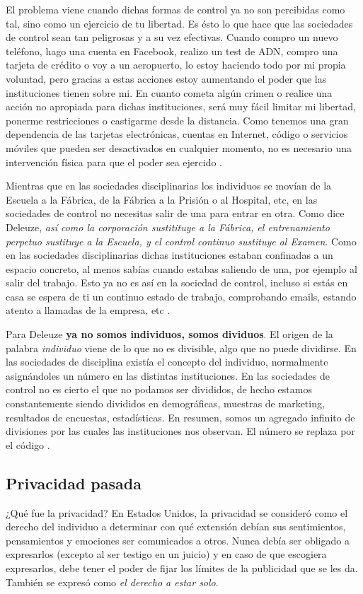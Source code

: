 \documentclass[11pt]{article}
\begin{document}
El problema viene cuando dichas formas de control ya no son percibidas como tal, sino como un ejercicio de tu libertad. Es ésto lo que hace que las sociedades de control sean tan peligrosas y a su vez efectivas. Cuando compro un nuevo teléfono, hago una cuenta en Facebook, realizo un test de ADN, compro una tarjeta de crédito o voy a un aeropuerto, lo estoy haciendo todo por mi propia voluntad, pero gracias a estas acciones estoy aumentando el poder que las instituciones tienen sobre mi. En cuanto cometa algún crimen o realice una acción no apropiada para dichas instituciones, será muy fácil limitar mi libertad, ponerme restricciones o castigarme desde la distancia. Como tenemos una gran dependencia de las tarjetas electrónicas, cuentas en Internet, código o servicios móviles que pueden ser desactivados en cualquier momento, no es necesario una intervención física para que el poder sea ejercido \cite{cp-societies}.

Mientras que en las sociedades disciplinarias los individuos se movían de la Escuela a la Fábrica, de la Fábrica a la Prisión o al Hospital, etc, en las sociedades de control no necesitas salir de una para entrar en otra. Como dice Deleuze, \textit{así como la corporación sustitituye a la Fábrica, el entrenamiento perpetuo sustituye a la Escuela, y el control continuo sustituye al Examen}. Como en las sociedades disciplinarias dichas instituciones estaban confinadas a un espacio concreto, al menos sabías cuando estabas saliendo de una, por ejemplo al salir del trabajo. Esto ya no es así en la sociedad de control, incluso si estás en casa se espera de ti un continuo estado de trabajo, comprobando emails, estando atento a llamadas de la empresa, etc \cite{cp-societies}.

Para Deleuze \textbf{ya no somos individuos, somos dividuos}. El origen de la palabra \textit{individuo} viene de lo que no es divisible, algo que no puede dividirse. En las sociedades de disciplina existía el concepto del individuo, normalmente asignándoles un número en las distintas instituciones. En las sociedades de control no es cierto el que no podamos ser divididos, de hecho estamos constantemente siendo divididos en demográficas, muestras de marketing, resultados de encuestas, estadísticas. En resumen, somos un agregado infinito de divisiones por las cuales las instituciones nos observan. El número se replaza por el código \cite{cp-societies}.
\subsection{Privacidad pasada}
¿Qué fue la privacidad? En Estados Unidos, la privacidad se consideró como el derecho del individuo a determinar con qué extensión debían sus sentimientos, pensamientos y emociones ser comunicados a otros. Nunca debía ser obligado a expresarlos (excepto al ser testigo en un juicio) y en caso de que escogiera expresarlos, debe tener el poder de fijar los límites de la publicidad que se les da. También se expresó como \textit{el derecho a estar solo}.
\end{document}
